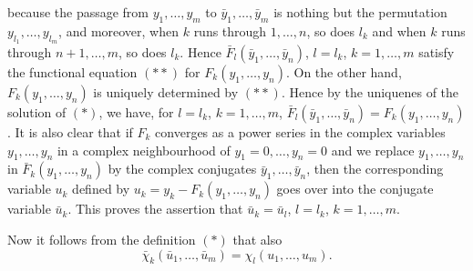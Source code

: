 because the passage from $y_1, \ldots, y_m$ to $\bar{y}_1,\ldots,
\bar{y}_m$ is nothing but the permutation $y_{l_1}, \ldots, y_{l_m}$,
and moreover, when $k$ runs through $1, \ldots, n$, so does $l_k$ and
when $k$ runs through $n+1, \ldots, m$, so does $l_k$. Hence
$\bar{F}_l (\bar{y}_1, \ldots, \bar{y}_n)$, $l = l_k$, $k =1, \ldots,
m$ satisfy the functional equation  $(\ast\ast)$ for $F_k(y_1, \ldots,
y_n)$. On the other hand, $F_k(y_1, \ldots, y_n)$ is uniquely
determined by $(\ast\ast)$. Hence by the uniquenes of the solution of
$(\ast)$, we have, for $l =l_k$, $k=1, \ldots, m$,
$\bar{F}_l(\bar{y}_1,\ldots, \bar{y}_n) = F_k(y_1, \ldots, y_n)$. It
is also clear that if $F_k$ converges as a power series in the complex
variables $y_1, \ldots, y_n$ in a complex neighbourhood of $y_1 = 0,
\ldots, y_n = 0$ and we replace $y_1, \ldots, y_n$ in
$\bar{F}_k(y_1,\ldots, y_n)$ by the complex conjugates $\bar{y}_1,
\ldots, \bar{y}_n$, then the corresponding variable $u_k$ defined by
$u_k = y_k - F_k (y_1, \ldots, y_n)$  goes over into the conjugate
variable $\bar{u}_k$. This proves the assertion that $\bar{u}_k =
\bar{u}_l$, $l=l_k$, $k=1, \ldots, m$. 

Now it follows from the definition $(\ast)$ that also
$$
\bar{\chi}_k (\bar{u}_1, \ldots, \bar{u}_m) = \chi_l (u_1, \ldots, u_m).
$$

